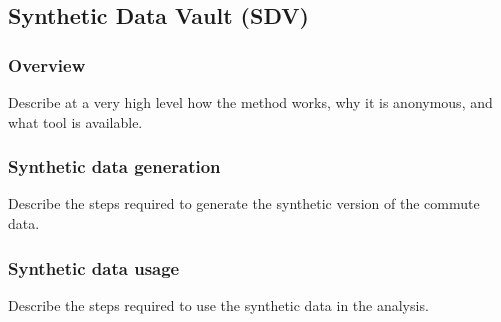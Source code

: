 \subsection{Synthetic Data Vault (SDV)}
\label{sec:method_sdv}


\subsubsection{Overview}

Describe at a very high level how the method works, why it is anonymous, and what tool is available.

\subsubsection{Synthetic data generation}

Describe the steps required to generate the synthetic version of the commute data.

\subsubsection{Synthetic data usage}

Describe the steps required to use the synthetic data in the analysis.